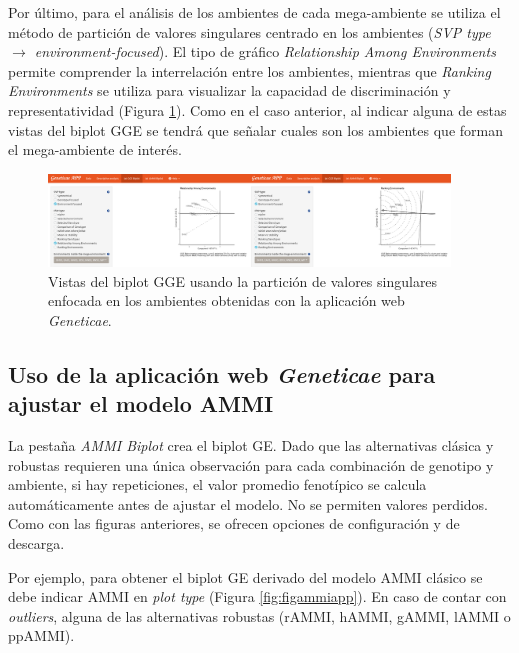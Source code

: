 Por último, para el análisis de los ambientes de cada mega-ambiente se utiliza el método de partición de valores singulares centrado en los ambientes (\emph{SVP type $\rightarrow$ environment-focused}). El tipo de gráfico \emph{Relationship Among Environments} permite comprender la interrelación entre los ambientes, mientras que \emph{Ranking Environments} se utiliza para visualizar la capacidad de discriminación y representatividad (Figura \ref{fig:ggebip3}). Como en el caso anterior, al indicar alguna de estas vistas del biplot GGE se tendrá que señalar cuales son los ambientes que forman el mega-ambiente de interés. 


\begin{figure}[h]
	\begin{center}
		\includegraphics[width=0.95\textwidth]{./Graficos/www/GGE_biplotAPP3.png}
	\end{center}
	\caption{Vistas del biplot GGE usando la partición de valores singulares enfocada en los ambientes obtenidas con la aplicación web \emph{Geneticae}.}
	\label{fig:ggebip3}
\end{figure}


\subsection{Uso de la aplicación web \emph{Geneticae} para ajustar el modelo AMMI}

La pestaña \emph{AMMI Biplot} crea el biplot GE. Dado que las alternativas clásica y robustas requieren una única observación para cada combinación de genotipo y ambiente, si hay repeticiones, el valor promedio fenotípico se calcula automáticamente antes de ajustar el modelo. No se permiten valores perdidos. Como con las figuras anteriores, se ofrecen opciones de configuración y de descarga.

Por ejemplo, para obtener el biplot GE derivado del modelo AMMI clásico se debe indicar AMMI en \emph{plot type} (Figura \ref{fig:figammiapp}). En caso de contar con \emph{outliers}, alguna de las alternativas robustas (rAMMI, hAMMI, gAMMI, lAMMI o ppAMMI).
 

